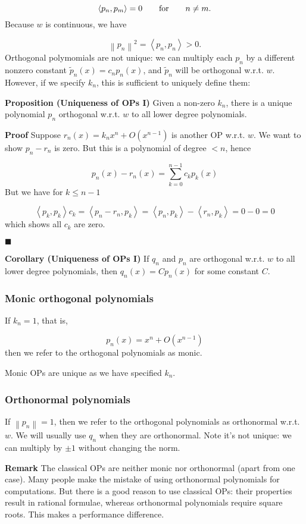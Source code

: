 \documentclass[12pt,a4paper]{article}
\def\qqfor{\qquad\hbox{for}\qquad}
\def\ip<#1>{\left\langle{#1}\right\rangle}
\def\norm#1{\left\| #1 \right\|}
\begin{document}
\[
\ip<p_n,p_m> = 0\qqfor n \neq m.
\]
Because $w$ is continuous, we have

\[
\norm{p_n}^2 = \ip<p_n,p_n> > 0 .
\]
Orthogonal polymomials are not unique: we can multiply each $p_n$ by a different nonzero constant $\tilde p_n(x) = c_n p_n(x)$, and $\tilde p_n$ will be orthogonal w.r.t. $w$.  However, if we specify $k_n$, this is sufficient to uniquely define them:

\textbf{Proposition (Uniqueness of OPs I)} Given a non-zero $k_n$, there is a unique polynomial $p_n$ orthogonal w.r.t. $w$ to all lower degree polynomials.

\textbf{Proof} Suppose $r_n(x) = k_n x^n + O(x^{n-1})$ is another  OP w.r.t. $w$. We want to show $p_n - r_n$ is zero. But this is a polynomial of degree $<n$, hence

\[
p_n(x) - r_n(x) = \sum_{k=0}^{n-1} c_k p_k(x)
\]
But we have for $k \leq n-1$

\[
\ip<p_k,p_k> c_k = \ip<p_n - r_n, p_k> = \ip<p_n,p_k> - \ip<r_n, p_k> = 0 - 0 = 0
\]
which shows all $c_k$ are zero.

\ensuremath{\blacksquare}

\textbf{Corollary (Uniqueness of OPs I)} If $q_n$ and $p_n$ are orthogonal w.r.t. $w$ to all lower degree polynomials, then $q_n(x) = C p_n(x)$ for some constant $C$.

\subsubsection{Monic orthogonal polynomials}
If $k_n = 1$, that is,

\[
p_n(x) = x^n + O(x^{n-1})
\]
then we refer to the orthogonal polynomials as monic.

Monic OPs are unique as we have specified $k_n$.

\subsubsection{Orthonormal polynomials}
If  $\norm{p_n} = 1$, then we refer to the orthogonal polynomials as orthonormal w.r.t. $w$. We will usually use $q_n$ when they are orthonormal.   Note it's not unique: we can multiply by $\pm 1$ without changing the norm.

\textbf{Remark} The classical OPs are neither monic nor orthonormal (apart from one case). Many people make the mistake of using orthonormal polynomials for computations. But there is a good reason to use classical OPs: their properties result in rational formulae, whereas orthonormal polynomials require square roots. This makes a performance difference.
\end{document}
